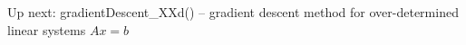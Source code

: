 
\begin{DoxyRefList}
\item[\label{todo__todo000001}%
\Hypertarget{todo__todo000001}%
Namespace \mbox{\hyperlink{namespaceopt}{opt}} ]Up next\+: gradient\+Descent\+\_\+\+X\+Xd() -- gradient descent method for over-\/determined linear systems $Ax=b$ 
\end{DoxyRefList}